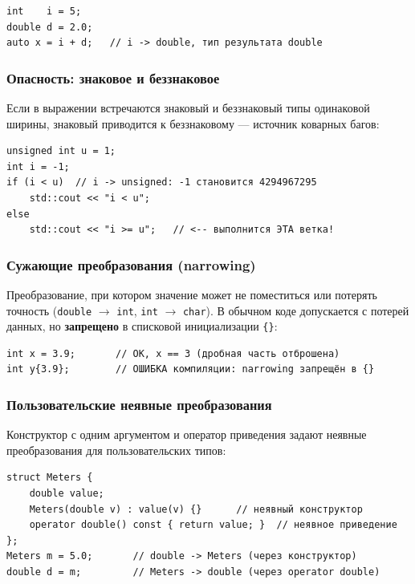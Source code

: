 \begin{lstlisting}
int    i = 5;
double d = 2.0;
auto x = i + d;   // i -> double, тип результата double
\end{lstlisting}

\subsubsection{Опасность: знаковое и беззнаковое}

Если в выражении встречаются знаковый и беззнаковый типы одинаковой ширины,
знаковый приводится к беззнаковому --- источник коварных багов:

\begin{lstlisting}
unsigned int u = 1;
int i = -1;
if (i < u)  // i -> unsigned: -1 становится 4294967295
    std::cout << "i < u";
else
    std::cout << "i >= u";   // <-- выполнится ЭТА ветка!
\end{lstlisting}

\subsubsection{Сужающие преобразования (narrowing)}

Преобразование, при котором значение может не поместиться или потерять точность
(\texttt{double} $\to$ \texttt{int}, \texttt{int} $\to$ \texttt{char}). В обычном
коде допускается с потерей данных, но \textbf{запрещено} в списковой
инициализации \texttt{\{\}}:

\begin{lstlisting}
int x = 3.9;       // OK, x == 3 (дробная часть отброшена)
int y{3.9};        // ОШИБКА компиляции: narrowing запрещён в {}
\end{lstlisting}

\subsubsection{Пользовательские неявные преобразования}

Конструктор с одним аргументом и оператор приведения задают неявные
преобразования для пользовательских типов:

\begin{lstlisting}
struct Meters {
    double value;
    Meters(double v) : value(v) {}      // неявный конструктор
    operator double() const { return value; }  // неявное приведение
};
Meters m = 5.0;       // double -> Meters (через конструктор)
double d = m;         // Meters -> double (через operator double)
\end{lstlisting}

